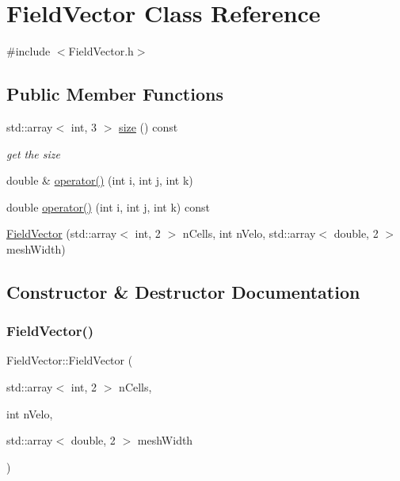 \hypertarget{classFieldVector}{}\section{Field\+Vector Class Reference}
\label{classFieldVector}


{\ttfamily \#include $<$Field\+Vector.\+h$>$}

\subsection*{Public Member Functions}
\begin{DoxyCompactItemize}
\item 
std\+::array$<$ int, 3 $>$ \mbox{\hyperlink{classFieldVector_a3129b0ce1a664aaf667c2fc7229321f2}{size}} () const
\begin{DoxyCompactList}\small\item\em get the size \end{DoxyCompactList}\item 
double \& \mbox{\hyperlink{classFieldVector_a09bf710dc0e18a99985eac4425aa27cb}{operator()}} (int i, int j, int k)
\item 
double \mbox{\hyperlink{classFieldVector_acabecdf0d9848a128c76d53911f7c600}{operator()}} (int i, int j, int k) const
\item 
\mbox{\hyperlink{classFieldVector_af00022c44aff1c24b6ba42aec595cb7d}{Field\+Vector}} (std\+::array$<$ int, 2 $>$ n\+Cells, int n\+Velo, std\+::array$<$ double, 2 $>$ mesh\+Width)
\end{DoxyCompactItemize}


\subsection{Constructor \& Destructor Documentation}
\mbox{\label{classFieldVector_af00022c44aff1c24b6ba42aec595cb7d}} 
\subsubsection{\texorpdfstring{FieldVector()}{FieldVector()}}
{\footnotesize\ttfamily Field\+Vector\+::\+Field\+Vector (\begin{DoxyParamCaption}\item[{std\+::array$<$ int, 2 $>$}]{n\+Cells,  }\item[{int}]{n\+Velo,  }\item[{std\+::array$<$ double, 2 $>$}]{mesh\+Width }\end{DoxyParamCaption})}




